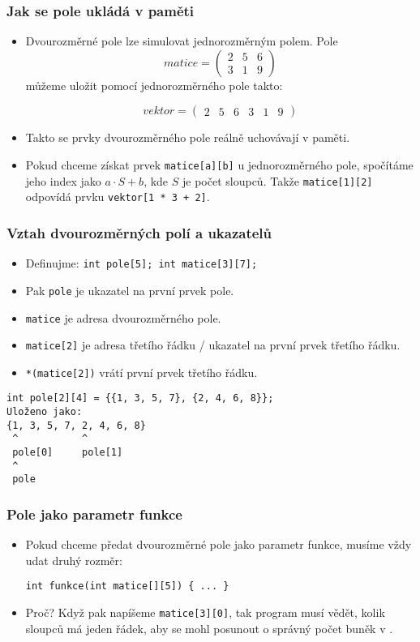 \documentclass{beamer}
\newenvironment{itemizex}%
  {\large \begin{itemize}%
    \setlength{\itemsep}{8pt}%
    \setlength{\parskip}{8pt}}%
  {\end{itemize}}
\begin{document}
\begin{frame}[t,fragile]\frametitle{Jak se pole ukládá v paměti} 
    \begin{itemize}
        \item Dvourozměrné pole lze simulovat jednorozměrným polem. Pole
$$
matice=\begin{pmatrix}
2&5&6\\
3&1&9
\end{pmatrix}
$$
        můžeme uložit pomocí jednorozměrného pole takto:

$$
vektor=\begin{pmatrix}
2&5&6&3&1&9
\end{pmatrix}
$$
        \item Takto se prvky dvourozměrného pole reálně uchovávají v paměti. 
        \item Pokud chceme získat prvek \texttt{matice[a][b]} u jednorozměrného pole, spočítáme jeho index jako $a\cdot S+b$, kde $S$ je počet sloupců. Takže \texttt{matice[1][2]} odpovídá prvku \texttt{vektor[1 * 3 + 2]}.
    \end{itemize}
\end{frame}



\begin{frame}[t,fragile]\frametitle{Vztah dvourozměrných polí a ukazatelů} 
    \begin{itemize}
        \item Definujme: \texttt{int pole[5]; int matice[3][7];}
        \item Pak \texttt{pole} je ukazatel na první prvek pole.
        \item \texttt{matice} je adresa dvourozměrného pole. 
        \item \texttt{matice[2]} je adresa třetího řádku / ukazatel na první prvek třetího řádku.
        \item \texttt{*(matice[2])} vrátí první prvek třetího řádku. 
    \end{itemize}

\begin{verbatim}
int pole[2][4] = {{1, 3, 5, 7}, {2, 4, 6, 8}};
Uloženo jako:
{1, 3, 5, 7, 2, 4, 6, 8}
 ^           ^
 pole[0]     pole[1]
 ^
 pole
\end{verbatim}
\end{frame}


\begin{frame}[t,fragile]\frametitle{Pole jako parametr funkce} 
    \vskip 1cm
    \begin{itemizex}
        \item Pokud chceme předat dvourozměrné pole jako parametr funkce, musíme vždy udat druhý rozměr:
\begin{verbatim} 
int funkce(int matice[][5]) { ... }
\end{verbatim}
        \item Proč? Když pak napíšeme \texttt{matice[3][0]}, tak program musí vědět, kolik sloupců má jeden řádek, aby se mohl posunout o správný počet buněk v .
    \end{itemizex}
\end{frame}
\end{document}
